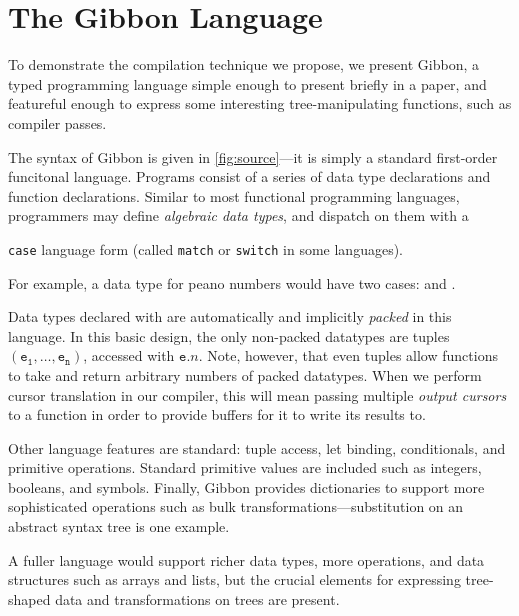 \documentclass[a4paper,english]{lipics-v2016}
\newcommand{\treelang}{Gibbon\xspace} %
\newif\ifcurly
\begin{document}
\section{The \treelang{} Language}
\label{sec:language}


To demonstrate the compilation technique we propose, we present
\treelang, a typed programming language simple enough to
present briefly in a paper, and featureful enough to express some
interesting tree-manipulating functions, such as compiler passes.

The syntax of \treelang is given in \cref{fig:source}---it is
simply a standard first-order funcitonal language.
Programs consist of a series of data type declarations and function
declarations. Similar to most functional programming languages,
programmers may define \emph{algebraic data types}, and dispatch on
them with a
\ifcurly
\texttt{match} language form (called \texttt{case} or \texttt{switch} in some languages).
\else
\texttt{case} language form (called \texttt{match} or \texttt{switch} in some languages).
\fi
For example, a data type for peano
numbers would have two cases:  and .


Data types declared with  are automatically and implicitly
{\em packed} in this language.  In this basic design, the only
non-packed datatypes are tuples $\mathtt{(e_1,\dots,e_n)}$, accessed with
$\mathtt{e} . n$.
%
Note, however, that even tuples allow functions to take and return arbitrary
numbers of packed datatypes.  When we perform cursor translation in our
compiler, this will mean passing multiple {\em output cursors} to a function in
order to provide buffers for it to write its results to.

Other language features are standard: tuple access, let binding,
conditionals, and primitive operations.  Standard primitive values are included
such as integers, booleans, and symbols.
%
Finally, \treelang provides dictionaries to support more sophisticated
operations such as bulk transformations---substitution on an abstract
syntax tree is one example.

A fuller language would support richer data types, more operations,
and data structures such as arrays and lists, but the crucial elements
for expressing tree-shaped data and transformations on trees are present. 
\end{document}
